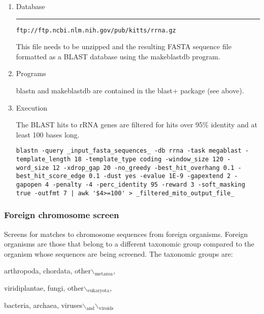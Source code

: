\documentclass[11pt]{article}
\begin{document}
\begin{enumerate}
\item Database
\label{sec:orgf58526a}

\noindent\rule{\textwidth}{0.5pt}

\begin{verbatim}
ftp://ftp.ncbi.nlm.nih.gov/pub/kitts/rrna.gz
\end{verbatim}

This file needs to be unzipped and the resulting FASTA sequence file
formatted as a BLAST database using the makeblastdb program.

\item Programs
\label{sec:org28aee9b}


blastn and makeblastdb are contained in the blast+ package (see above).

\item Execution
\label{sec:org34440f0}


The BLAST hits to rRNA genes are filtered for hits over 95\% identity and
at least 100 bases long.

\begin{verbatim}
blastn -query _input_fasta_sequences_ -db rrna -task megablast -template_length 18 -template_type coding -window_size 120 -word_size 12 -xdrop_gap 20 -no_greedy -best_hit_overhang 0.1 -best_hit_score_edge 0.1 -dust yes -evalue 1E-9 -gapextend 2 -gapopen 4 -penalty -4 -perc_identity 95 -reward 3 -soft_masking true -outfmt 7 | awk '$4>=100' > _filtered_mito_output_file_
\end{verbatim}
\end{enumerate}

\subsubsection{Foreign chromosome screen}
\label{sec:orgd9068fb}


Screens for matches to chromosome sequences from foreign organisms.
Foreign organisms are those that belong to a different taxonomic group
compared to the organism whose sequences are being screened. The
taxonomic groups are:

arthropoda, chordata, other$\backslash$\(_{\text{metazoa}}\),

viridiplantae, fungi, other$\backslash$\(_{\text{eukaryota}}\),

bacteria, archaea, viruses$\backslash$\(_{\text{and}}\)$\backslash$\(_{\text{viroids}}\)
\end{document}
